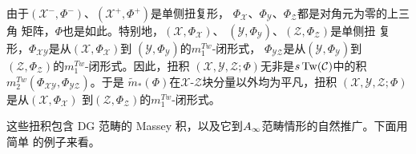 由于$(\mathcal{X}^{-},\Phi^{-})$、$(\mathcal{X}^{+},\Phi^{+})$是单侧扭复形，
$\Phi_{\mathcal{X}}$、$\Phi_{\mathcal{Y}}$、$\Phi_{\mathcal{Z}}$都是对角元为零的上三角
矩阵，$\Phi$也是如此。特别地，$(\mathcal{X},\Phi_{\mathcal{X}})$、
$(\mathcal{Y},\Phi_{\mathcal{Y}})$、$(\mathcal{Z},\Phi_{\mathcal{Z}})$是单侧扭
复形，$\Phi_{\mathcal{X}\mathcal{Y}}$是从$(\mathcal{X},\Phi_{\mathcal{X}})$到
$(\mathcal{Y},\Phi_{\mathcal{Y}})$的$m_{1}^{Tw}$-闭形式，
$\Phi_{\mathcal{Y}\mathcal{Z}}$是从$(\mathcal{Y},\Phi_{\mathcal{Y}})$到
$(\mathcal{Z},\Phi_{\mathcal{Z}})$的$m_{1}^{Tw}$-闭形式。因此，扭积
$(\mathcal{X},\mathcal{Y},\mathcal{Z};\Phi)$无非是$s\operatorname{Tw}(\mathcal{C})$中的积
$m_{2}^{Tw}(\Phi_{\mathcal{X}\mathcal{Y}},\Phi_{\mathcal{Y}\mathcal{Z}})$。于是
$\tilde{m}_{*}(\Phi)$在$\mathcal{X}$-$\mathcal{Z}$块分量以外均为平凡，扭积
$(\mathcal{X},\mathcal{Y},\mathcal{Z};\Phi)$是从$(\mathcal{X},\Phi_{\mathcal{X}})$
到$(\mathcal{Z},\Phi_{\mathcal{Z}})$的$m_{1}^{Tw}$-闭形式。

这些扭积包含 DG 范畴的 Massey 积，以及它到$A_{\infty}$范畴情形的自然推广。下面用简单
的例子来看。

